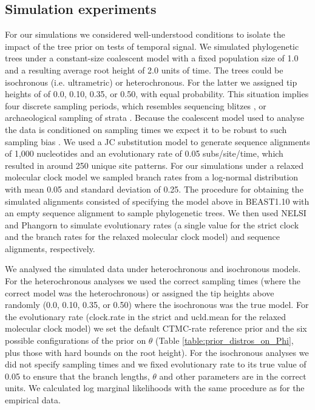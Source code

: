 \documentclass[10pt,letterpaper]{article}
\begin{document}
\subsection*{Simulation experiments}
For our simulations we considered well-understood conditions to isolate the impact of the tree prior on tests of temporal signal. We simulated phylogenetic trees under a constant-size coalescent model with a fixed population size of 1.0 and a resulting average root height of 2.0 units of time. The trees could be isochronous (i.e. ultrametric) or heterochronous. For the latter we assigned tip heights of of 0.0, 0.10, 0.35, or 0.50, with equal probability. This situation implies four discrete sampling periods, which resembles sequencing blitzes \cite{porter2022new}, or archaeological sampling of strata \cite{zhang2016total}. Because the coalescent model used to analyse the data is conditioned on sampling times we expect it to be robust to such sampling bias \cite{stadler2015well, volz2014sampling, featherstone2021infectious}. We used a JC substitution model \cite{jukes1969evolution} to generate sequence alignments of 1,000 nucleotides and an evolutionary rate of 0.05 subs/site/time, which resulted in around 250 unique site patterns. For our simulations under a relaxed molecular clock model we sampled branch rates from a log-normal distribution with mean 0.05 and standard deviation of 0.25. The procedure for obtaining the simulated alignments consisted of specifying the model above in BEAST1.10 with an empty sequence alignment to sample phylogenetic trees. We then used NELSI \cite{ho2015simulating} and Phangorn \cite{schliep2011phangorn} to simulate evolutionary rates (a single value for the strict clock and the branch rates for the relaxed molecular clock model) and sequence alignments, respectively.

We analysed the simulated data under heterochronous and isochronous models. For the heterochronous analyses we used the correct sampling times (where the correct model was the heterochronous) or assigned the tip heights above randomly (0.0, 0.10, 0.35, or 0.50) where the isochronous was the true model. For the evolutionary rate (clock.rate in the strict and ucld.mean for the relaxed molecular clock model) we set the default CTMC-rate reference prior and the six possible configurations of the prior on $\theta$ (Table \ref{table:prior_distros_on_Phi}, plus those with hard bounds on the root height). For the isochronous analyses we did not specify sampling times and we fixed evolutionary rate to its true value of 0.05 to ensure that the branch lengths, $\theta$ and other parameters are in the correct units. We calculated log marginal likelihoods with the same procedure as for the empirical data.
\end{document}
